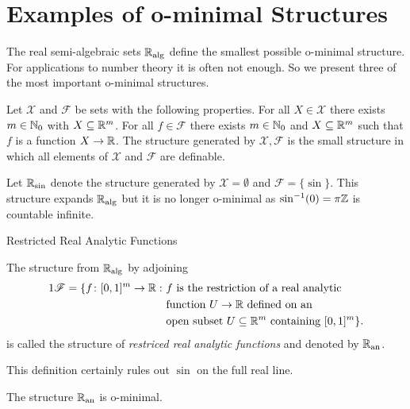 \documentclass{beamer}
\begin{document}
\section{Examples of o-minimal Structures}

\begin{frame}
  The real semi-algebraic sets ${\mathbb{R}}_{\mathrm{alg}}$ define the smallest possible
  o-minimal structure. For applications to
  number theory it is often not enough. So we present three of the most
  important o-minimal structures.

  \begin{definition}
    Let $\mathscr{X}$ and $\mathscr{F}$ be sets with the following
    properties. For all $X\in \mathscr{X}$ there exists $m\in{\mathbb{N}}_0$ with
    $X\subseteq{\mathbb{R}}^m$. For all $f\in \mathscr{F}$ there exists $m\in{\mathbb{N}}_0$
    and $X\subseteq{\mathbb{R}}^m$ such that $f$ is a function $X\rightarrow{\mathbb{R}}$. The
    \alert{structure generated} by $\mathscr{X},\mathscr{F}$ is the small
    structure in which all elements of $\mathcal{X}$ and $\mathscr{F}$ are
    definable.
  \end{definition}

  \begin{example}
    Let ${\mathbb{R}}_{\sin}$ denote the structure generated by
    $\mathscr{X}=\emptyset$ and $\mathscr{F}=\{\sin \}$.
    This structure expands ${\mathbb{R}}_{\mathrm{alg}}$ but it is no longer o-minimal as
    $\sin^{-1}(0)=\pi{\mathbb{Z}}$ is countable infinite.
  \end{example}
\end{frame}

\begin{frame}{Restricted Real Analytic Functions}

  \begin{definition}
    The structure  from ${\mathbb{R}}_{\mathrm{alg}}$ by adjoining
    \begin{alignat*}1
      \mathscr{F} = \{f \colon [0,1]^m\rightarrow\IR:  \,\,&\text{$f$ is the
        restriction of a real analytic}\\&\text{function $U\rightarrow
        \IR$ defined on an}\\
      &\text{open subset
        $U\subset\IR^m$ containing $[0,1]^m$}\}.  
    \end{alignat*}
     is called the structure of \emph{restriced real analytic
       functions}
     and denoted by ${{\mathbb{R}}_{\mathrm{an}}}$.
  \end{definition}

  This definition certainly rules out $\sin$ on the full real line.

  \begin{theorem}[Gabrielov]
    The structure ${{\mathbb{R}}_{\mathrm{an}}}$ is o-minimal. 
  \end{theorem}
\end{frame}
\end{document}
